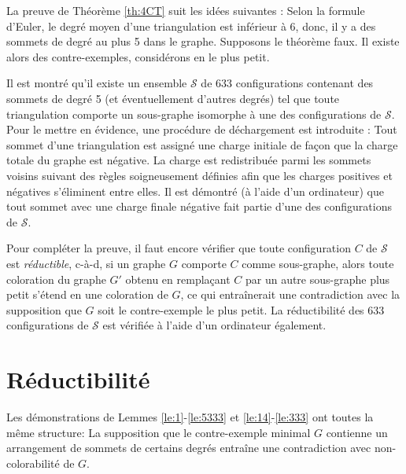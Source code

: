 \documentclass[10pt,a4paper]{article}
\newtheorem{proposition}{Proposition}
\begin{document}


La preuve de Théorème \ref{th:4CT} suit les idées suivantes : Selon la formule d'Euler, le degré moyen d'une triangulation est inférieur à 6, donc, il y a des sommets de degré au plus 5 dans le graphe. Supposons le théorème faux. Il existe alors des contre-exemples, considérons en le plus petit. 

Il est montré qu'il existe un ensemble $\mathcal{S}$ de 633 configurations contenant des sommets de degré 5 (et éventuellement d'autres degrés) tel que toute triangulation comporte un sous-graphe isomorphe à une des configurations de $\mathcal{S}$. Pour le mettre en évidence, une procédure de déchargement est introduite : Tout sommet d'une triangulation est assigné une charge initiale de façon que la charge totale du graphe est négative. La charge est redistribuée parmi les sommets voisins suivant des règles soigneusement définies afin que les charges positives et négatives s'éliminent entre elles. Il est démontré (à l'aide d'un ordinateur) que tout sommet avec une charge finale négative fait partie d'une des configurations de $\mathcal{S}$.

Pour compléter la preuve, il faut encore vérifier que toute configuration $C$ de $\mathcal{S}$ est \emph{réductible}, c-à-d, si un graphe $G$ comporte $C$ comme sous-graphe, alors toute coloration du graphe $G'$ obtenu en remplaçant $C$ par un autre sous-graphe plus petit s'étend en une coloration de $G$, ce qui entraînerait une contradiction avec la supposition que $G$ soit le contre-exemple le plus petit.
La réductibilité des 633 configurations de $\mathcal{S}$ est vérifiée à l'aide d'un ordinateur également.

\newpage





\section{Réductibilité}
\label{chap:red}
Les démonstrations de Lemmes \ref{le:1}-\ref{le:5333} et \ref{le:14}-\ref{le:333} ont toutes la même structure: La supposition que le contre-exemple minimal $G$ contienne un arrangement de sommets de certains degrés entraîne une contradiction avec non-colorabilité de $G$.
\end{document}
